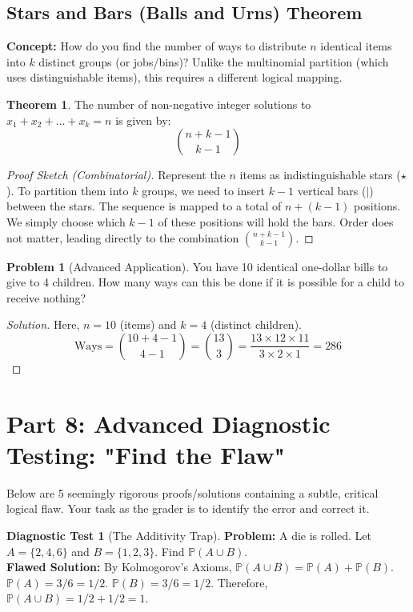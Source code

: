 \documentclass[11pt, letterpaper]{article}
\theoremstyle{definition}
\newtheorem{theorem}{Theorem}[section]
\newtheorem{example}{Problem}
\newtheorem{flaw}{Diagnostic Test}
\theoremstyle{remark}
\newcommand{\Prob}{\mathbb{P}}
\begin{document}
\subsection{Stars and Bars (Balls and Urns) Theorem}
\textbf{Concept:} How do you find the number of ways to distribute $n$ identical items into $k$ distinct groups (or jobs/bins)? 
Unlike the multinomial partition (which uses distinguishable items), this requires a different logical mapping.

\begin{theorem}
    The number of non-negative integer solutions to $x_1 + x_2 + \dots + x_k = n$ is given by:
    \[ \binom{n + k - 1}{k - 1} \]
\end{theorem}
\begin{proof}[Proof Sketch (Combinatorial)]
    Represent the $n$ items as indistinguishable stars ($\star$). To partition them into $k$ groups, we need to insert $k-1$ vertical bars ($|$) between the stars. 
    The sequence is mapped to a total of $n + (k - 1)$ positions. We simply choose which $k-1$ of these positions will hold the bars. Order does not matter, leading directly to the combination $\binom{n + k - 1}{k - 1}$.
\end{proof}

\begin{example}[Advanced Application]
    You have 10 identical one-dollar bills to give to 4 children. How many ways can this be done if it is possible for a child to receive nothing?
\end{example}
\begin{proof}[Solution]
    Here, $n=10$ (items) and $k=4$ (distinct children).
    \[ \text{Ways} = \binom{10 + 4 - 1}{4 - 1} = \binom{13}{3} = \frac{13 \times 12 \times 11}{3 \times 2 \times 1} = 286 \]
\end{proof}

\section{Part 8: Advanced Diagnostic Testing: "Find the Flaw"}

Below are 5 seemingly rigorous proofs/solutions containing a subtle, critical logical flaw. Your task as the grader is to identify the error and correct it.

\begin{flaw}[The Additivity Trap]
    \textbf{Problem:} A die is rolled. Let $A = \{2, 4, 6\}$ and $B = \{1, 2, 3\}$. Find $\Prob(A \cup B)$. \\
    \textbf{Flawed Solution:} By Kolmogorov's Axioms, $\Prob(A \cup B) = \Prob(A) + \Prob(B)$. 
    $\Prob(A) = 3/6 = 1/2$. $\Prob(B) = 3/6 = 1/2$. Therefore, $\Prob(A \cup B) = 1/2 + 1/2 = 1$.
\end{flaw}
\end{document}
